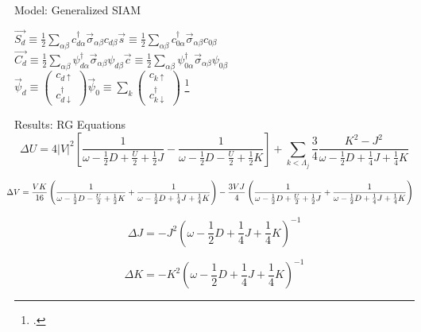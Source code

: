 \documentclass[aspectratio=169]{beamer}
\begin{document}
\begin{frame}[noframenumbering]{Model: Generalized SIAM}
\begin{center}
\end{center}
\vspace*{30pt}
\hspace*{\fill}\(\vec{S_d} \equiv \frac{1}{2}\sum_{\alpha\beta}c^\dagger_{d\alpha}\vec{\sigma}_{\alpha\beta}c_{d\beta}\)\hspace*{\fill}\(\vec{s} \equiv \frac{1}{2}\sum_{\alpha\beta}c^\dagger_{0\alpha}\vec{\sigma}_{\alpha\beta}c_{0\beta}\)\hspace*{\fill}
\\
\vspace*{15pt}
\hspace*{\fill}\(\vec{C_d} \equiv \frac{1}{2}\sum_{\alpha\beta}\psi^\dagger_{d\alpha}\vec{\sigma}_{\alpha\beta}\psi_{d\beta}\)\hspace*{\fill}\(\vec{c} \equiv \frac{1}{2}\sum_{\alpha\beta}\psi^\dagger_{0\alpha}\vec{\sigma}_{\alpha\beta}\psi_{0\beta}\)\hspace*{\fill}
\\
\vspace*{15pt}
\hspace*{\fill}\(\vec{\psi}_d \equiv \begin{pmatrix} c_{d \uparrow} \\ c^\dagger_{d \downarrow}\end{pmatrix} \)\hspace*{\fill}\(\vec{\psi}_0 \equiv \sum_k \begin{pmatrix} c_{k \uparrow} \\ c^\dagger_{k \downarrow}\end{pmatrix}\)\hspace*{\fill}
\footcite{Schrieffer_Wolff}
\end{frame}

\begin{frame}[noframenumbering]{Results: RG Equations}
\[
\Delta U = 4|V|^2 \left[\frac{1}{\omega - \frac{1}{2}D + \frac{U}{2} + \frac{1}{2}J}  - \frac{1}{\omega - \frac{1}{2}D - \frac{U}{2} + \frac{1}{2}K}\right] + \sum_{k<\Lambda_j} \frac{3}{4}\frac{K^2 - J^2}{\omega - \frac{1}{2}D + \frac{1}{4}J + \frac{1}{4}K}
\]

\[
	\hspace*{-10pt}\Delta V = \frac{V K}{16}\left(\frac{1}{\omega - \frac{1}{2}D - \frac{U}{2} + \frac{1}{2}K} + \frac{1}{\omega - \frac{1}{2}D + \frac{1}{4}J + \frac{1}{4}K} \right) - \frac{3VJ}{4}\left( \frac{1}{\omega - \frac{1}{2}D + \frac{U}{2} + \frac{1}{2}J} + \frac{1}{\omega - \frac{1}{2}D + \frac{1}{4}J + \frac{1}{4}K} \right)
\]

\[
\Delta J = - J^2\left(\omega - \frac{1}{2}D + \frac{1}{4}J + \frac{1}{4}K\right)^{-1}
\]

\[
\Delta K = - K^2\left(\omega - \frac{1}{2}D + \frac{1}{4}J + \frac{1}{4}K\right)^{-1}
\]
\end{frame}
\end{document}
